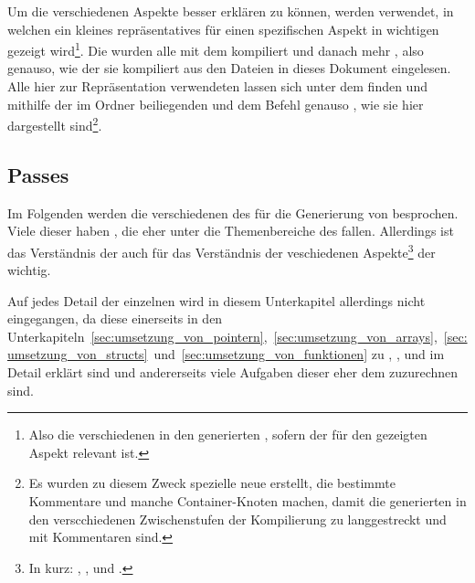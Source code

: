 Um die verschiedenen Aspekte besser erklären zu können, werden  verwendet, in welchen ein kleines repräsentatives  für einen spezifischen Aspekt in wichtigen  gezeigt wird\footnote{Also die verschiedenen in den  generierten , sofern der  für den gezeigten Aspekt relevant ist.}. Die  wurden alle mit dem  kompiliert und danach  mehr , also genauso, wie der  sie kompiliert aus den Dateien in dieses Dokument eingelesen. Alle hier zur Repräsentation verwendeten  lassen sich unter dem  finden und mithilfe der im Ordner  beiliegenden  und dem Befehl  genauso , wie sie hier dargestellt sind\footnote{Es wurden zu diesem Zweck spezielle neue  erstellt, die bestimmte Kommentare  und manche Container-Knoten  machen, damit die generierten  in den verscchiedenen Zwischenstufen der Kompilierung  zu langgestreckt und  mit Kommentaren sind.}.

\subsection{Passes}
\label{sec:passes}

Im Folgenden werden die verschiedenen  des  für die Generierung von  besprochen. Viele dieser  haben , die eher unter die Themenbereiche des  fallen. Allerdings ist das Verständnis der  auch für das Verständnis der veschiedenen Aspekte\footnote{In kurz: , ,  und .} der  wichtig.

Auf jedes Detail der einzelnen  wird in diesem Unterkapitel allerdings nicht eingegangen, da diese einerseits in den Unterkapiteln~\ref{sec:umsetzung_von_pointern},~\ref{sec:umsetzung_von_arrays},~\ref{sec:umsetzung_von_structs}~und~\ref{sec:umsetzung_von_funktionen} zu ,  ,  und  im Detail erklärt sind und andererseits viele Aufgaben dieser  eher dem  zuzurechnen sind.

